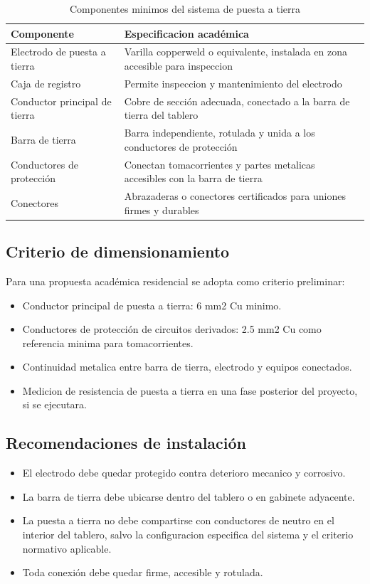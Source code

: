 \begin{table}[H]
\centering
\small
\caption{Componentes minimos del sistema de puesta a tierra}
\label{tab:componentes-puesta-tierra}
\begin{tabularx}{\textwidth}{p{4.0cm}>{\raggedright\arraybackslash}X}
\toprule
\textbf{Componente} & \textbf{Especificacion académica} \\
\midrule
Electrodo de puesta a tierra & Varilla copperweld o equivalente, instalada en zona accesible para inspeccion \\
Caja de registro & Permite inspeccion y mantenimiento del electrodo \\
Conductor principal de tierra & Cobre de sección adecuada, conectado a la barra de tierra del tablero \\
Barra de tierra & Barra independiente, rotulada y unida a los conductores de protección \\
Conductores de protección & Conectan tomacorrientes y partes metalicas accesibles con la barra de tierra \\
Conectores & Abrazaderas o conectores certificados para uniones firmes y durables \\
\bottomrule
\end{tabularx}
\end{table}

\subsection{Criterio de dimensionamiento}

Para una propuesta académica residencial se adopta como criterio preliminar:

\begin{itemize}
  \item Conductor principal de puesta a tierra: 6 mm2 Cu minimo.
  \item Conductores de protección de circuitos derivados: 2.5 mm2 Cu como referencia minima para tomacorrientes.
  \item Continuidad metalica entre barra de tierra, electrodo y equipos conectados.
  \item Medicion de resistencia de puesta a tierra en una fase posterior del proyecto, si se ejecutara.
\end{itemize}

\subsection{Recomendaciones de instalación}

\begin{itemize}
  \item El electrodo debe quedar protegido contra deterioro mecanico y corrosivo.
  \item La barra de tierra debe ubicarse dentro del tablero o en gabinete adyacente.
  \item La puesta a tierra no debe compartirse con conductores de neutro en el interior del tablero, salvo la configuracion especifica del sistema y el criterio normativo aplicable.
  \item Toda conexión debe quedar firme, accesible y rotulada.
\end{itemize}
